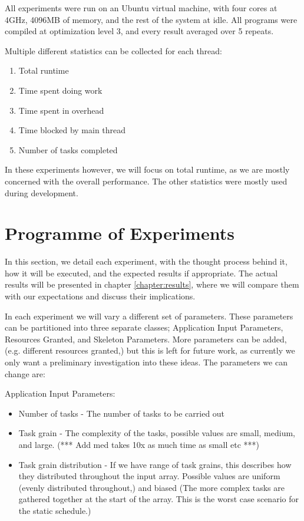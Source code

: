 All experiments were run on an Ubuntu virtual machine, with four cores at 4GHz, 4096MB of memory, and the rest of the system at idle. All programs were compiled at optimization level 3, and every result averaged over 5 repeats.

Multiple different statistics can be collected for each thread:

\begin{enumerate}
	\item Total runtime
	\item Time spent doing work
	\item Time spent in overhead
	\item Time blocked by main thread
	\item Number of tasks completed
\end{enumerate}

In these experiments however, we will focus on total runtime, as we are mostly concerned with the overall performance. The other statistics were mostly used during development.



\section{Programme of Experiments}

In this section, we detail each experiment, with the thought process behind it, how it will be executed, and the expected results if appropriate. The actual results will be presented in chapter \ref{chapter:results}, where we will compare them with our expectations and discuss their implications.

In each experiment we will vary a different set of parameters. These parameters can be partitioned into three separate classes; Application Input Parameters, Resources Granted, and Skeleton Parameters. More parameters can be added, (e.g. different resources granted,) but this is left for future work, as currently we only want a preliminary investigation into these ideas. The parameters we can change are:

Application Input Parameters:

\begin{itemize}
	\item Number of tasks - The number of tasks to be carried out
	\item Task grain - The complexity of the tasks, possible values are small, medium, and large. (*** Add med takes 10x as much time as small etc ***)
	\item Task grain distribution - If we have range of task grains, this describes how they distributed throughout the input array. Possible values are uniform (evenly distributed throughout,) and biased (The more complex tasks are gathered together at the start of the array. This is the worst case scenario for the static schedule.)
\end{itemize}

